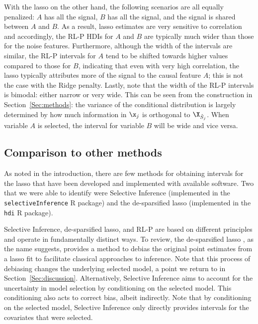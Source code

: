 With the lasso on the other hand, the following scenarios are all equally penalized: $A$ has all the signal, $B$ has all the signal, and the signal is shared between $A$ and $B$. As a result, lasso estimates are very sensitive to correlation and accordingly, the RL-P HDIs for $A$ and $B$ are typically much wider than those for the noise features. Furthermore, although the width of the intervals are similar, the RL-P intervals for $A$ tend to be shifted towards higher values compared to those for $B$, indicating that even with very high correlation, the lasso typically attributes more of the signal to the causal feature $A$; this is not the case with the Ridge penalty. Lastly, note that the width of the RL-P intervals is bimodal: either narrow or very wide. This can be seen from the construction in Section~\ref{Sec:methods}: the variance of the conditional distribution is largely determined by how much information in $\x_j$ is orthogonal to $\X_{\hat{S}_j}$. When variable $A$ is selected, the interval for variable $B$ will be wide and vice versa.

\subsection{Comparison to other methods} \label{Sec:Comparison}

As noted in the introduction, there are few methods for obtaining intervals for the lasso that have been developed and implemented with available software. Two that we were able to identify were Selective Inference (implemented in the \texttt{selectiveInference} R package) and the de-sparsified lasso (implemented in the \texttt{hdi} R package).

Selective Inference, de-sparsified lasso, and RL-P are based on different principles and operate in fundamentally distinct ways. To review, the de-sparsified lasso \citep{ZhangZhang2014}, as the name suggests, provides a method to debias the original point estimates from a lasso fit to facilitate classical approaches to inference. Note that this process of debiasing changes the underlying selected model, a point we return to in Section~\ref{Sec:discussion}. Alternatively, Selective Inference \citep{Lee2016,Tibshirani2016} aims to account for the uncertainty in model selection by conditioning on the selected model. This conditioning also acts to correct bias, albeit indirectly. Note that by conditioning on the selected model, Selective Inference only directly provides intervals for the covariates that were selected.


